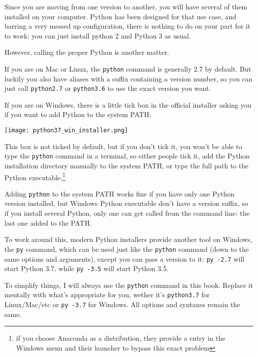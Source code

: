 Since you are moving from one version to another, you will have several of them installed on your computer. Python has been designed for that use case, and barring a very messed up configuration, there is nothing to do on your part for it to work: you can just install python 2 and Python 3 as usual.

However, calling the proper Python is another matter.

If you are on Mac or Linux, the \lstinline{python} command is generally 2.7 by default. But luckily you also have aliases with a suffix containing a version number, so you can just call \lstinline{python2.7} or \lstinline{python3.6} to use the exact version you want.

If you are on Windows, there is a little tick box in the official installer asking you if you want to add Python to the system PATH:

\texttt{[image: python37\_win\_installer.png]}

This box is not ticked by default, but if you don't tick it, you won't be able to type the \lstinline{python} command in a terminal, so either people tick it, add the Python installation directory manually to the system PATH, or type the full path to the Python executable.\footnote{if you choose Anaconda as a distribution, they provide a  entry in the Windows  menu and their launcher to bypass this exact problem}

Adding \lstinline{python} to the system PATH works fine if you have only one Python version installed, but Windows Python executable don't have a version suffix, so if you install several Python, only one can get called from the command line: the last one added to the PATH.

To work around this, modern Python installers provide another tool on Windows, the \lstinline{py} command, which can be used just like the \lstinline{python} command (down to the same options and arguments), except you can pass a version to it: \lstinline{py -2.7} will start Python 3.7, while \lstinline{py -3.5} will start Python 3.5.

\begin{warning}
To simplify things, I will always use the \lstinline{python} command in this book. Replace it mentally with what's appropriate for you, wether it's \lstinline{python3.7} for Linux/Mac/etc or \lstinline{py -3.7} for Windows. All options and syntaxes remain the same.
\end{warning}

